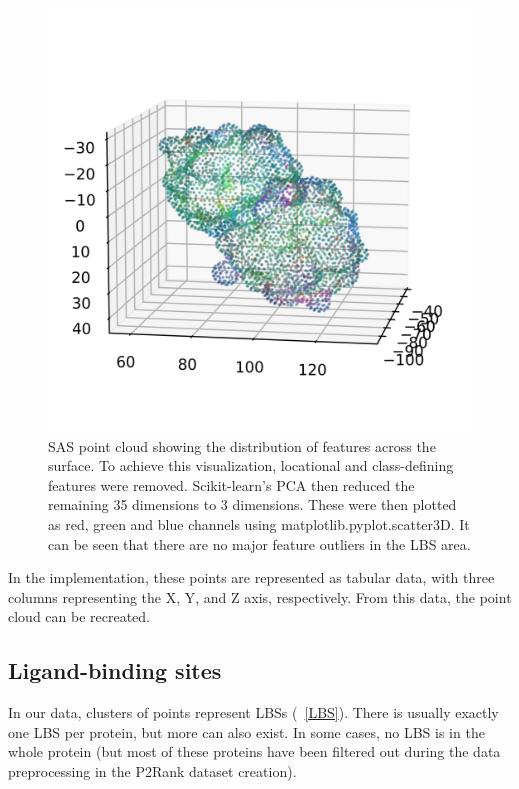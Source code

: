 \begin{figure}
    \centering
    \includegraphics[width=1\linewidth]{point_cloud_pca.png}
    \caption{SAS point cloud showing the distribution of features across the surface. To achieve this visualization, locational and class-defining features were removed. Scikit-learn's PCA then reduced the remaining 35 dimensions to 3 dimensions. These were then plotted as red, green and blue channels using matplotlib.pyplot.scatter3D. It can be seen that there are no major feature outliers in the LBS area.}
    \label{fig:pca_point_cloud}
\end{figure}

In the implementation, these points are represented as tabular data, with three columns representing the X, Y, and Z axis, respectively. From this data, the point cloud can be recreated.

\subsection{Ligand-binding sites}

In our data, clusters of points represent LBSs (~\ref{LBS}). There is usually exactly one LBS per protein, but more can also exist. In some cases, no LBS is in the whole protein (but most of these proteins have been filtered out during the data preprocessing in the P2Rank dataset creation).

